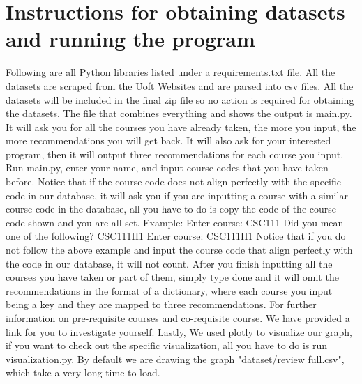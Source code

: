 \documentclass[fontsize=11pt]{article}
\begin{document}
\section*{Instructions for obtaining datasets and running the program}
Following are all Python libraries listed under a requirements.txt file. All the datasets are scraped from the Uoft Websites and are parsed into csv files. All the datasets will be included in the final zip file so no action is required for obtaining the datasets. The file that combines everything and shows the output is main.py. It will ask you for all the courses you have already taken, the more you input, the more recommendations you will get back. It will also ask for your interested program, then it will output three recommendations for each course you input. Run main.py, enter your name, and input course codes that you have taken before. Notice that if the course code does not align perfectly with the specific code in our database, it will ask you if you are inputting a course with a similar course code in the database, all you have to do is copy the code of the course code shown and you are all set. Example:  \newline Enter course:  CSC111 \newline
Did you mean one of the following? \newline
CSC111H1 \newline
Enter course:  CSC111H1  \newline
Notice that if you do not follow the above example and input the course code that align perfectly with the code in our database, it will not count. After you finish inputting all the courses you have taken or part of them, simply type done and it will omit the recommendations in the format of a dictionary, where each course you input being a key and they are mapped to three recommendations. For further information on pre-requisite courses and co-requisite course. We have provided a link for you to investigate yourself. \newline
Lastly, We used plotly to visualize our graph, if you want to check out the specific visualization, all you have to do is run visualization.py. By default we are drawing the graph "dataset/review full.csv", which take a very long time to load.
\end{document}
